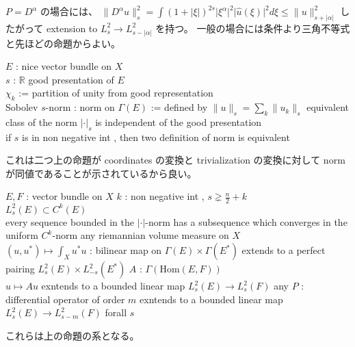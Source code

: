 \begin{Proof}
\itemprof
  \(P = D^\alpha\) の場合には、
  \(\lVert D^\alpha u \rVert_s^2 = \int (1 + \lvert \xi \rvert)^{2s} \lvert \xi^\alpha \rvert^2 \lvert \hat{u}(\xi) \rvert^2 d \xi \leq \lVert u \rVert_{s + \lvert \alpha \rvert}^2\)
  したがって extension to \(L_s^2 \to L_{s-\lvert \alpha \rvert}^2\) を持つ。
  一般の場合には条件より三角不等式と先ほどの命題からよい。
\end{Proof}

\begin{Theorem}
\itemwhen
  \(E\) : nice vector bundle on \(X\) \\
  \(s\) : \(\mathbb{R}\)
\itemdefi
  \For good presentation of \(E\) \\
  \Let \(\chi_k\) := partition of unity from good representation \\
  \Define Sobolev \(s\)-norm : norm on \(\Gamma(E)\) :=  defined by \(\lVert u \rVert_s = \sum_k \lVert u_k \rVert_s\)
\itemprop
  \Then equivalent class of the norm \(\lvert \cdot \rvert_s\) is independent of the good presentation \\
  \Then if \(s\) is in non negative int , then two definition of norm is equivalent
\end{Theorem}

\begin{Proof}
\itemprof
  これは二つ上の命題が coordinates の変換と trivialization の変換に対して norm が同値であることが示されているから良い。
\end{Proof}

\begin{Theorem}
\itemwhen
  \(E,F\) : vector bundle on \(X\)
\itemprop
  \For \(k\) : non negative int , \(s \gneq \frac{n}{2} + k\) \\
  \Then \(L^2_s(E) \subset C^k(E)\) \\
  \Then every sequence bounded in the \(\lvert \cdot \rvert\)-norm has a subsequence which converges in the uniform \(C^k\)-norm
\itemprop
  \For any riemannian volume measure on \(X\) \\
  \Then \((u,u^*) \mapsto \int_X u^*u\) : bilinear map on \(\Gamma(E) \times \Gamma(E^*)\) extends to a perfect pairing \(L^2_s(E) \times L^2_{-s}(E^*)\)
\itemprop
  \For \(A\) : \(\Gamma(\text{Hom}(E,F))\) \\
  \Then \(u \mapsto Au\) exntends to a bounded linear map \(L^2_s(E) \to L^2_s(F)\)
\itemprop
  \Then any \(P\) : differential operator of order \(m\) exntends to a bounded linear map \(L^2_s(E) \to L^2_{s-m}(F)\) forall \(s\)
\end{Theorem}

\begin{Proof}
\itemthen
  これらは上の命題の系となる。
\end{Proof}